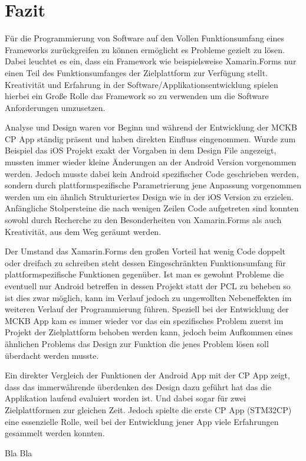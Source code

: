 %
%
% 
% 


\chapter{Fazit}
\label{chap:xamarinformsconclusion}

	Für die Programmierung von Software auf den Vollen Funktionsumfang eines Frameworks zurückgreifen zu können ermöglicht es Probleme gezielt zu lösen. Dabei leuchtet es ein, dass ein Framework wie beispielsweise Xamarin.Forms nur einen Teil des Funktionsumfanges der Zielplattform zur Verfügung stellt. Kreativität und Erfahrung in der Software/Applikationsentwicklung spielen hierbei ein Große Rolle das Framework so zu verwenden um die Software Anforderungen umzusetzen.

	Analyse und Design waren vor Beginn und während der Entwicklung der MCKB CP App ständig präsent und haben direkten Einfluss eingenommen. Wurde zum Beispiel das iOS Projekt exakt der Vorgaben in dem Design File angezeigt, mussten immer wieder kleine Änderungen an der Android Version vorgenommen werden. Jedoch musste dabei kein Android spezifischer Code geschrieben werden, sondern durch plattformspezifische Parametrierung jene Anpassung vorgenommen werden um ein ähnlich Strukturiertes Design wie in der iOS Version zu erzielen. Anfängliche Stolpersteine die nach wenigen Zeilen Code aufgetreten sind konnten sowohl durch Recherche zu den Besonderheiten von Xamarin.Forms als auch Kreativität, aus dem Weg geräumt werden.

	Der Umstand das Xamarin.Forms den großen Vorteil hat wenig Code doppelt oder dreifach zu schreiben steht dessen Eingeschränkten Funktionsumfang für plattformspezifische Funktionen gegenüber. Ist man es gewohnt Probleme die eventuell nur Android betreffen in dessen Projekt statt der PCL zu beheben so ist dies zwar möglich, kann im Verlauf jedoch zu ungewollten Nebeneffekten im weiteren Verlauf der Programmierung führen. Speziell bei der Entwicklung der MCKB App kam es immer wieder vor das ein spezifisches Problem zuerst im Projekt der Zielplattform behoben werden kann, jedoch beim Aufkommen eines ähnlichen Problems das Design zur Funktion die jenes Problem lösen soll überdacht werden musste.

	Ein direkter Vergleich der Funktionen der Android App mit der CP App zeigt, dass das immerwährende überdenken des Design dazu geführt hat das die Applikation laufend evaluiert worden ist. Und dabei sogar für zwei Zielplattformen zur gleichen Zeit. Jedoch spielte die erste CP App (STM32CP) eine essenzielle Rolle, weil bei der Entwicklung jener App viele Erfahrungen gesammelt werden konnten.

	Bla Bla
